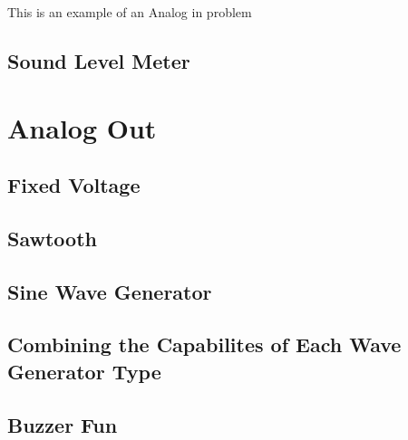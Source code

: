 \documentclass{article}
\begin{document}
This is an example of an Analog in problem



\subsection{Sound Level Meter} %
\label{sub:sound_level_meter}





\section{Analog Out} %
\label{sec:analog_out}

\subsection{Fixed Voltage} %
\label{sub:fixed_voltage}


\subsection{Sawtooth} %
\label{sub:sawtooth}


\subsection{Sine Wave Generator} %
\label{sub:sine_wave_generator}



\subsection{Combining the Capabilites of Each Wave Generator Type} %
\label{sub:combining_the_capabilites_of_each_wave_generator_type}


\subsection{Buzzer Fun} %
\label{sub:buzzer_fun}
\end{document}
